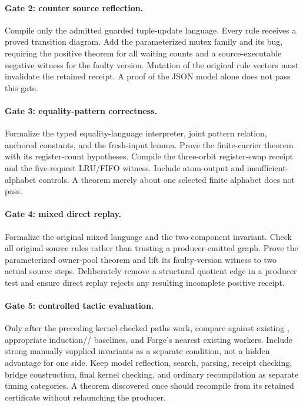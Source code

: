 \paragraph{Gate 2: counter source reflection.}
Compile only the admitted guarded tuple-update language. Every rule receives
a proved transition diagram. Add the parameterized mutex family and its bug,
requiring the positive theorem for all waiting counts and a source-executable
negative witness for the faulty version. Mutation of the original rule vectors
must invalidate the retained receipt. A proof of the JSON model alone does not
pass this gate.

\paragraph{Gate 3: equality-pattern correctness.}
Formalize the typed equality-language interpreter, joint pattern relation,
anchored constants, and the fresh-input lemma. Prove the finite-carrier theorem
with its register-count hypotheses. Compile the three-orbit register-swap
receipt and the five-request LRU/FIFO witness. Include atom-output and
insufficient-alphabet controls. A theorem merely about one selected finite
alphabet does not pass.

\paragraph{Gate 4: mixed direct replay.}
Formalize the original mixed language and the two-component invariant. Check
all original source rules rather than trusting a producer-emitted graph.
Prove the parameterized owner-pool theorem and lift its faulty-version witness
to two actual source steps. Deliberately remove a structural quotient edge in
a producer test and ensure direct replay rejects any resulting incomplete
positive receipt.

\paragraph{Gate 5: controlled tactic evaluation.}
Only after the preceding kernel-checked paths work, compare against existing
, appropriate induction// baselines, and
Forge's nearest existing workers. Include strong manually supplied invariants
as a separate condition, not a hidden advantage for one side. Keep model
reflection, search, parsing, receipt checking, bridge construction, final
kernel checking, and ordinary recompilation as separate timing categories.
A theorem discovered once should recompile from its retained certificate
without relaunching the producer.

